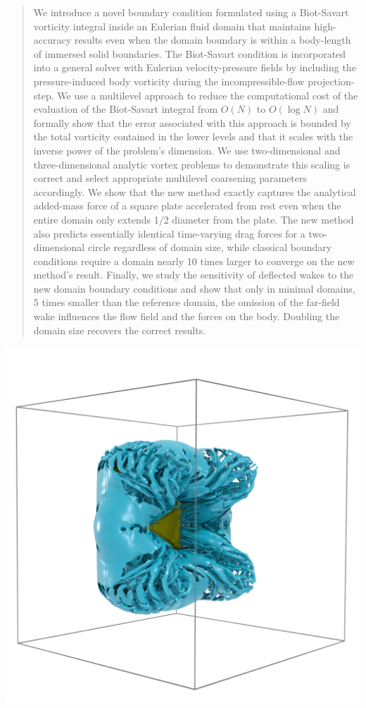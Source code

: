\documentclass[preprint,12pt]{elsarticle}
\begin{document}
\begin{frontmatter}
\begin{abstract}
We introduce a novel boundary condition formulated using a Biot-Savart vorticity integral inside an Eulerian fluid domain that maintains high-accuracy results even when the domain boundary is within a body-length of immersed solid boundaries. The Biot-Savart condition is incorporated into a general solver with Eulerian velocity-pressure fields by including the pressure-induced body vorticity during the incompressible-flow projection-step. We use a multilevel approach to reduce the computational cost of the evaluation of the Biot-Savart integral from $O(N)$ to $O(\log N)$ and formally show that the error associated with this approach is bounded by the total vorticity contained in the lower levels and that it scales with the inverse power of the problem's dimension. We use two-dimensional and three-dimensional analytic vortex problems to demonstrate this scaling is correct and select appropriate multilevel coarsening parameters accordingly. We show that the new method exactly captures the analytical added-mass force of a square plate accelerated from rest even when the entire domain only extends 1/2 diameter from the plate. The new method also predicts essentially identical time-varying drag forces for a two-dimensional circle regardless of domain size, while classical boundary conditions require a domain nearly 10 times larger to converge on the new method's result. Finally, we study the sensitivity of deflected wakes to the new domain boundary conditions and show that only in minimal domains, 5 times smaller than the reference domain, the omission of the far-field wake influences the flow field and the forces on the body. Doubling the domain size recovers the correct results.
\end{abstract}

\begin{graphicalabstract}
\includegraphics[width=1.1\textwidth]{tex/fig/disk_high_re_7.png}
\end{graphicalabstract}


\end{frontmatter}
\end{document}
